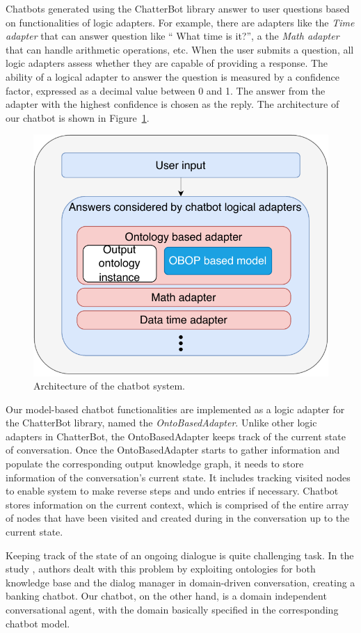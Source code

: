 \documentclass[runningheads]{llncs}
\begin{document}
Chatbots generated using the ChatterBot library answer to user questions based on functionalities of logic adapters. For example, there are adapters like the \textit{Time adapter} that can answer question like `` What time is it?'', a the \textit{Math adapter} that can handle arithmetic operations, etc. When the user submits a question, all logic adapters assess whether they are capable of providing a response. The ability of a logical adapter to answer the question is measured by a confidence factor, expressed as a decimal value between 0 and 1. The answer from the adapter with the highest confidence is chosen as the reply. The architecture of our chatbot is shown in Figure~\ref{fig:architecture}.
\begin{figure}[H]
  \centering
  \includegraphics[width=0.5\linewidth]{img/architecture}
  \caption{Architecture of the chatbot system.}
  \label{fig:architecture}
\end{figure}
Our model-based chatbot functionalities are implemented as a logic adapter for the ChatterBot library, named the \textit{OntoBasedAdapter}. Unlike other logic adapters in ChatterBot, the OntoBasedAdapter keeps track of the current state of conversation. Once the OntoBasedAdapter starts to gather information and populate the corresponding output knowledge graph, it needs to store information of the conversation's current state. It includes tracking visited nodes to enable system to make reverse steps and undo entries if necessary. Chatbot stores information on the current context, which is comprised of the entire array of nodes that have been visited and created during in the conversation up to the current state. 

Keeping track of the state of an ongoing dialogue is quite challenging task.
In the study \cite{altinok2018ontology}, authors dealt with this problem by exploiting ontologies for both knowledge base and the dialog manager in domain-driven conversation, creating a banking chatbot. Our chatbot, on the other hand, is a domain independent conversational agent, with the domain basically specified in the corresponding chatbot model. 
\end{document}

